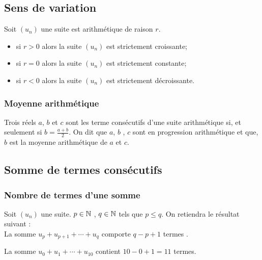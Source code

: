 \subsection*{Sens de variation}
 \begin{theorem}  Soit $(u_{n})$ une  suite est arithmétique  de raison $ r $.
  \begin{itemize}
  \item si $ r>0 $ alors la suite  $(u_{n})$ est strictement croissante;
   \item si $ r=0 $ alors la suite  $(u_{n})$ est strictement constante;
    \item si $ r<0 $ alors la suite  $(u_{n})$ est strictement décroissante.
  \end{itemize}
  \end{theorem}
  \subsubsection*{Moyenne arithmétique}
  Trois réels $ a$, $ b$  et $ c$ sont les terme consécutifs d'une suite arithmétique si, et seulement si $ b=\frac{a+b}{2} $.  On dit que $ a$, $ b$ , $ c$ sont en progression arithmétique et que, $ b$ est la moyenne arithmétique de $ a $ et $ c$.
  \subsection*{Somme de termes consécutifs}
  \subsubsection{Nombre de termes d'une somme}
  Soit $(u_{n})$ une  suite. $p\in\mathbb{N} $ , $q\in\mathbb{N} $ tels que $ p\leq q $. On retiendra le  résultat suivant :\\
La somme $u_{p}+u_{p+1}+ \cdots + u_{q} $ comporte $q-p+1$ termes .
 \begin{example} La somme $ u_{0}+u_{1}+ \cdots + u_{10} $ contient $ 10-0+1=11 $ termes.
 \end{example}
